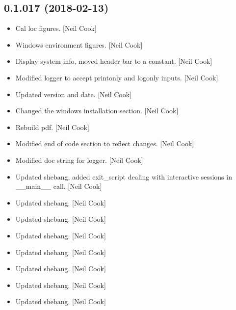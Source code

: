 \documentclass[a4paper,10pt,english]{report}
\begin{document}
\subsection{0.1.017 (2018-02-13)}
\label{\detokenize{misc/changelog:id485}}\begin{itemize}
\item {} 
Cal loc figures. {[}Neil Cook{]}

\item {} 
Windows environment figures. {[}Neil Cook{]}

\item {} 
Display system info, moved header bar to a constant. {[}Neil Cook{]}

\item {} 
Modified logger to accept printonly and logonly inputs. {[}Neil Cook{]}

\item {} 
Updated version and date. {[}Neil Cook{]}

\item {} 
Changed the windows installation section. {[}Neil Cook{]}

\item {} 
Rebuild pdf. {[}Neil Cook{]}

\item {} 
Modified end of code section to reflect changes. {[}Neil Cook{]}

\item {} 
Modified doc string for logger. {[}Neil Cook{]}

\item {} 
Updated shebang, added exit\_script dealing with interactive sessions
in \_\_main\_\_ call. {[}Neil Cook{]}

\item {} 
Updated shebang. {[}Neil Cook{]}

\item {} 
Updated shebang. {[}Neil Cook{]}

\item {} 
Updated shebang. {[}Neil Cook{]}

\item {} 
Updated shebang. {[}Neil Cook{]}

\item {} 
Updated shebang. {[}Neil Cook{]}

\item {} 
Updated shebang. {[}Neil Cook{]}

\item {} 
Updated shebang. {[}Neil Cook{]}


\end{itemize}
\end{document}
